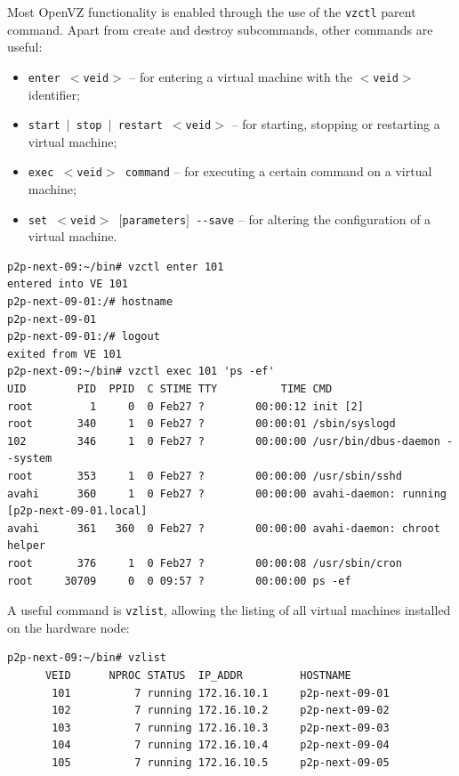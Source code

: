 Most OpenVZ functionality is enabled through the use of the \texttt{vzctl} parent
command. Apart from create and destroy subcommands, other commands are useful:

\begin{itemize}
  \item \texttt{enter $<$veid$>$} -- for entering a virtual machine with the
  \texttt{$<$veid$>$} identifier;
  \item \texttt{start $|$ stop $|$ restart $<$veid$>$} -- for starting,
  stopping or restarting a virtual machine;
  \item \texttt{exec $<$veid$>$ command} -- for executing a certain command on
  a virtual machine;
  \item \texttt{set $<$veid$>$ $[$parameters$]$ -{}-save} -- for altering the
  configuration of a virtual machine.
\end{itemize}

\footnotesize
\begin{verbatim}
p2p-next-09:~/bin# vzctl enter 101
entered into VE 101
p2p-next-09-01:/# hostname
p2p-next-09-01
p2p-next-09-01:/# logout
exited from VE 101
p2p-next-09:~/bin# vzctl exec 101 'ps -ef'
UID        PID  PPID  C STIME TTY          TIME CMD
root         1     0  0 Feb27 ?        00:00:12 init [2]
root       340     1  0 Feb27 ?        00:00:01 /sbin/syslogd
102        346     1  0 Feb27 ?        00:00:00 /usr/bin/dbus-daemon --system
root       353     1  0 Feb27 ?        00:00:00 /usr/sbin/sshd
avahi      360     1  0 Feb27 ?        00:00:00 avahi-daemon: running [p2p-next-09-01.local]
avahi      361   360  0 Feb27 ?        00:00:00 avahi-daemon: chroot helper
root       376     1  0 Feb27 ?        00:00:08 /usr/sbin/cron
root     30709     0  0 09:57 ?        00:00:00 ps -ef
\end{verbatim}
\normalsize

A useful command is \texttt{vzlist}, allowing the listing of all virtual
machines  installed on the hardware node:

\footnotesize
\begin{verbatim}
p2p-next-09:~/bin# vzlist
      VEID      NPROC STATUS  IP_ADDR         HOSTNAME
       101          7 running 172.16.10.1     p2p-next-09-01
       102          7 running 172.16.10.2     p2p-next-09-02
       103          7 running 172.16.10.3     p2p-next-09-03
       104          7 running 172.16.10.4     p2p-next-09-04
       105          7 running 172.16.10.5     p2p-next-09-05
\end{verbatim}
\normalsize

